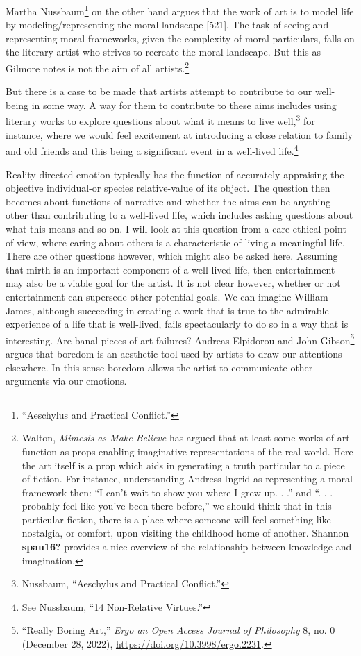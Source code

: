 \documentclass[phdthesis,12pt,final]{wuthesis}
\theoremstyle{definition}
\theoremstyle{definition}
\theoremstyle{definition}
\theoremstyle{definition}
\theoremstyle{remark}
\begin{document}
Martha Nussbaum\footnote{{``Aeschylus and Practical Conflict.''}} on the other hand argues that the work of art is to model life by modeling/representing the moral landscape {[}521{]}. The task of seeing and representing moral frameworks, given the complexity of moral particulars, falls on the literary artist who strives to recreate the moral landscape. But this as Gilmore notes is not the aim of all artists.\footnote{Walton, \emph{Mimesis as {Make-Believe}} has argued that at least some works of art function as props enabling imaginative representations of the real world. Here the art itself is a prop which aids in generating a truth particular to a piece of fiction. For instance, understanding Andress Ingrid as representing a moral framework then: ``I can't wait to show you where I grew up. . .'' and ``. . . probably feel like you've been there before,'' we should think that in this particular fiction, there is a place where someone will feel something like nostalgia, or comfort, upon visiting the childhood home of another. Shannon \textbf{spau16?} provides a nice overview of the relationship between knowledge and imagination.}

But there is a case to be made that artists attempt to contribute to our well-being in some way. A way for them to contribute to these aims includes using literary works to explore questions about what it means to live well,\footnote{Nussbaum, {``Aeschylus and Practical Conflict.''}} for instance, where we would feel excitement at introducing a close relation to family and old friends and this being a significant event in a well-lived life.\footnote{See Nussbaum, {``14 {Non-Relative Virtues}.''}}

Reality directed emotion typically has the function of accurately appraising the objective individual-or species relative-value of its object. The question then becomes about functions of narrative and whether the aims can be anything other than contributing to a well-lived life, which includes asking questions about what this means and so on. I will look at this question from a care-ethical point of view, where caring about others is a characteristic of living a meaningful life. There are other questions however, which might also be asked here. Assuming that mirth is an important component of a well-lived life, then entertainment may also be a viable goal for the artist. It is not clear however, whether or not entertainment can supersede other potential goals. We can imagine William James, although succeeding in creating a work that is true to the admirable experience of a life that is well-lived, fails spectacularly to do so in a way that is interesting. Are banal pieces of art failures? Andreas Elpidorou and John Gibson\footnote{{``Really {Boring Art},''} \emph{Ergo an Open Access Journal of Philosophy} 8, no. 0 (December 28, 2022), \url{https://doi.org/10.3998/ergo.2231}.} argues that boredom is an aesthetic tool used by artists to draw our attentions elsewhere. In this sense boredom allows the artist to communicate other arguments via our emotions.
\end{document}
